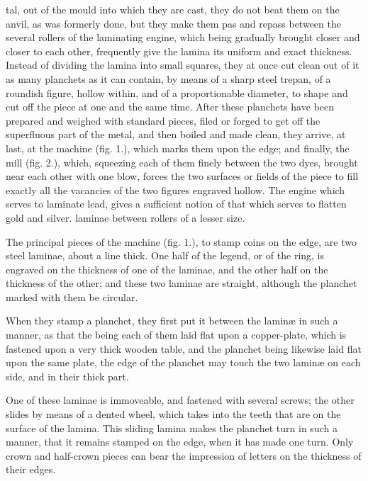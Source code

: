 \documentclass{article}
\begin{document}
tal, out of the mould into which they are cast, they do not beat them on the anvil, as was formerly done, but they make them pas and repass between the several rollers of the laminating engine, which being gradually brought closer and closer to each other, frequently give the lamina its uniform and exact thickness. Instead of dividing the lamina into small squares, they at once cut clean out of it as many planchets as it can contain, by means of a sharp steel trepan, of a roundish figure, hollow within, and of a proportionable diameter, to shape and cut off the piece at one and the same time. After these planchets have been prepared and weighed with standard pieces, filed or forged to get off the superfluous part of the metal, and then boiled and made clean, they arrive, at last, at the machine (fig. 1.), which marks them upon the edge; and finally, the mill (fig. 2.), which, squeezing each of them finely between the two dyes, brought near each other with one blow, forces the two surfaces or fields of the piece to fill exactly all the vacancies of the two figures engraved hollow. The engine which serves to laminate lead, gives a sufficient notion of that which serves to flatten gold and silver. laminae between rollers of a lesser size.

The principal pieces of the machine (fig. 1.), to stamp coins on the edge, are two steel laminae, about a line thick. One half of the legend, or of the ring, is engraved on the thickness of one of the laminae, and the other half on the thickness of the other; and these two laminae are straight, although the planchet marked with them be circular.

When they stamp a planchet, they first put it between the laminæ in such a manner, as that the being each of them laid flat upon a copper-plate, which is fastened upon a very thick wooden table, and the planchet being likewise laid flat upon the same plate, the edge of the planchet may touch the two laminæ on each side, and in their thick part.

One of these laminae is immoveable, and fastened with several screws; the other slides by means of a dented wheel, which takes into the teeth that are on the surface of the lamina. This sliding lamina makes the planchet turn in such a manner, that it remains stamped on the edge, when it has made one turn. Only crown and half-crown pieces can bear the impression of letters on the thickness of their edges.
\end{document}
